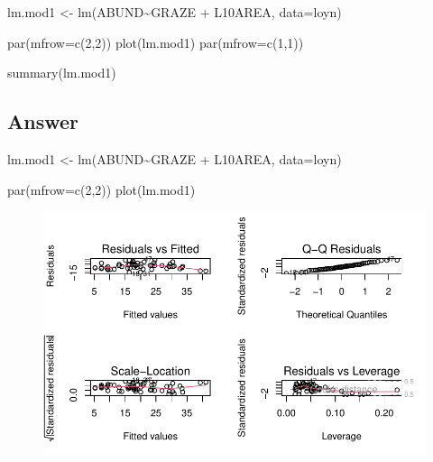 \documentclass[
  10pt,
  letterpaper,
  DIV=11,
  numbers=noendperiod]{scrartcl}
\newenvironment{Shaded}{\begin{snugshade}}{\end{snugshade}}
\newcommand{\AttributeTok}[1]{\textcolor[rgb]{0.40,0.45,0.13}{#1}}
\newcommand{\DecValTok}[1]{\textcolor[rgb]{0.68,0.00,0.00}{#1}}
\newcommand{\FunctionTok}[1]{\textcolor[rgb]{0.28,0.35,0.67}{#1}}
\newcommand{\NormalTok}[1]{\textcolor[rgb]{0.00,0.23,0.31}{#1}}
\newcommand{\OtherTok}[1]{\textcolor[rgb]{0.00,0.23,0.31}{#1}}
\newcommand{\SpecialCharTok}[1]{\textcolor[rgb]{0.37,0.37,0.37}{#1}}
\begin{document}
\begin{Shaded}
\begin{Highlighting}[]
\NormalTok{lm.mod1 }\OtherTok{\textless{}{-}} \FunctionTok{lm}\NormalTok{(ABUND}\SpecialCharTok{\textasciitilde{}}\NormalTok{GRAZE }\SpecialCharTok{+}\NormalTok{ L10AREA, }\AttributeTok{data=}\NormalTok{loyn)}

\FunctionTok{par}\NormalTok{(}\AttributeTok{mfrow=}\FunctionTok{c}\NormalTok{(}\DecValTok{2}\NormalTok{,}\DecValTok{2}\NormalTok{))}
\FunctionTok{plot}\NormalTok{(lm.mod1)}
\FunctionTok{par}\NormalTok{(}\AttributeTok{mfrow=}\FunctionTok{c}\NormalTok{(}\DecValTok{1}\NormalTok{,}\DecValTok{1}\NormalTok{))}

\FunctionTok{summary}\NormalTok{(lm.mod1)}
\end{Highlighting}
\end{Shaded}

\hypertarget{answer-7}{%
\subsection{Answer}\label{answer-7}}

\begin{Shaded}
\begin{Highlighting}[]
\NormalTok{lm.mod1 }\OtherTok{\textless{}{-}} \FunctionTok{lm}\NormalTok{(ABUND}\SpecialCharTok{\textasciitilde{}}\NormalTok{GRAZE }\SpecialCharTok{+}\NormalTok{ L10AREA, }\AttributeTok{data=}\NormalTok{loyn)}

\FunctionTok{par}\NormalTok{(}\AttributeTok{mfrow=}\FunctionTok{c}\NormalTok{(}\DecValTok{2}\NormalTok{,}\DecValTok{2}\NormalTok{))}
\FunctionTok{plot}\NormalTok{(lm.mod1)}
\end{Highlighting}
\end{Shaded}

\begin{figure}[H]

{\centering \includegraphics{ENVX2001-2024-Lab07_files/figure-pdf/mlmod-1.pdf}

}

\end{figure}
\end{document}
